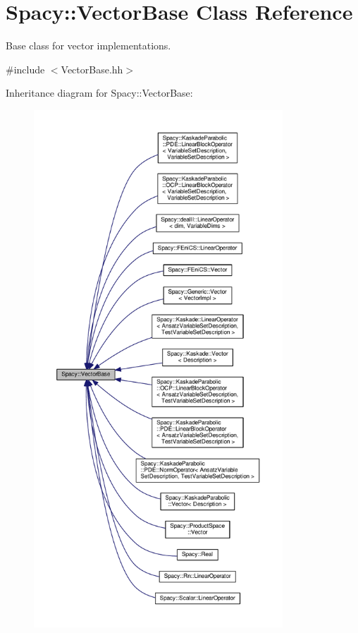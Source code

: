 \hypertarget{classSpacy_1_1VectorBase}{\section{Spacy\-:\-:Vector\-Base Class Reference}
\label{classSpacy_1_1VectorBase}
}


Base class for vector implementations.  




{\ttfamily \#include $<$Vector\-Base.\-hh$>$}



Inheritance diagram for Spacy\-:\-:Vector\-Base\-:
\nopagebreak
\begin{figure}[H]
\begin{center}
\leavevmode
\includegraphics[height=550pt]{classSpacy_1_1VectorBase__inherit__graph}
\end{center}
\end{figure}
